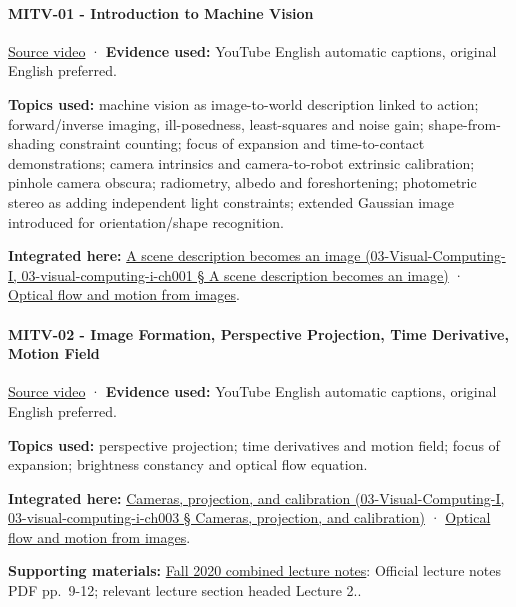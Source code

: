 \paragraph{MITV-01 - Introduction to Machine Vision}\label{mitv-01---introduction-to-machine-vision}

\href{https://www.youtube.com/watch?v=tY2gczObpfU}{Source video} · \textbf{Evidence used:} YouTube English automatic captions, original English preferred.

\textbf{Topics used:} machine vision as image-to-world description linked to action; forward/inverse imaging, ill-posedness, least-squares and noise gain; shape-from-shading constraint counting; focus of expansion and time-to-contact demonstrations; camera intrinsics and camera-to-robot extrinsic calibration; pinhole camera obscura; radiometry, albedo and foreshortening; photometric stereo as adding independent light constraints; extended Gaussian image introduced for orientation/shape recognition.

\textbf{Integrated here:} \href{}{A scene description becomes an image (03-Visual-Computing-I, 03-visual-computing-i-ch001 § A scene description becomes an image)} · \hyperref[04-visual-computing-ii-ch030]{Optical flow and motion from images}.

\paragraph{MITV-02 - Image Formation, Perspective Projection, Time Derivative, Motion Field}\label{mitv-02---image-formation-perspective-projection-time-derivative-motion-field}

\href{https://www.youtube.com/watch?v=uM5AoUgCA00}{Source video} · \textbf{Evidence used:} YouTube English automatic captions, original English preferred.

\textbf{Topics used:} perspective projection; time derivatives and motion field; focus of expansion; brightness constancy and optical flow equation.

\textbf{Integrated here:} \href{}{Cameras, projection, and calibration (03-Visual-Computing-I, 03-visual-computing-i-ch003 § Cameras, projection, and calibration)} · \hyperref[04-visual-computing-ii-ch030]{Optical flow and motion from images}.

\textbf{Supporting materials:} \href{https://ocw.mit.edu/courses/6-801-machine-vision-fall-2020/9ec44f69e72995c370b3797818ba01e6_MIT6_801F20_lectureNotes.pdf}{Fall 2020 combined lecture notes}: Official lecture notes PDF pp.~9-12; relevant lecture section headed Lecture 2..

